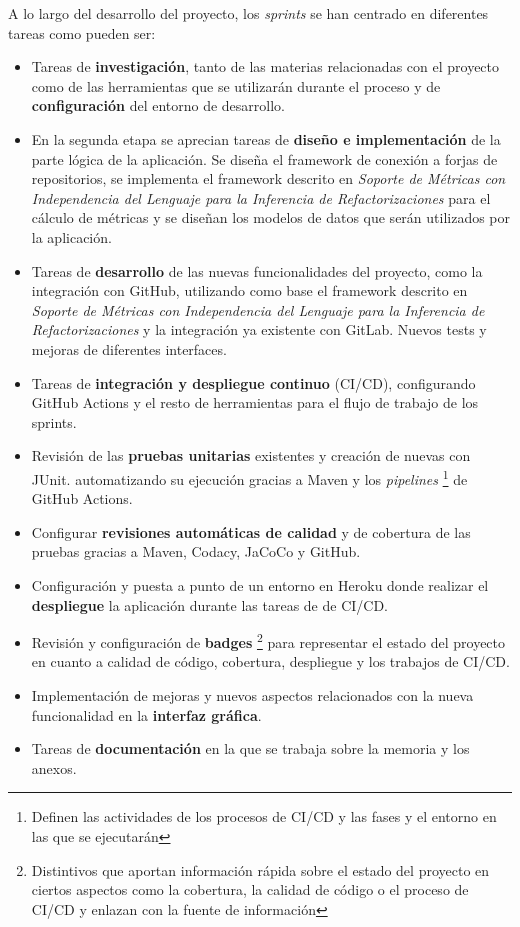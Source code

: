 A lo largo del desarrollo del proyecto, los \textit{sprints} se han centrado en diferentes tareas como pueden ser:
\begin{itemize}
	\item  Tareas de \textbf{investigación}, tanto de las materias relacionadas con el proyecto como de las herramientas que se utilizarán durante el proceso y de \textbf{configuración} del entorno de desarrollo.
	\item En la segunda etapa se aprecian tareas de \textbf{diseño e implementación} de la parte lógica de la aplicación. Se diseña el framework de conexión a forjas de repositorios, se implementa el framework descrito en \textit{Soporte de Métricas con Independencia del Lenguaje para la Inferencia de Refactorizaciones}  \cite{marticorena_sanchez_soporte_2005} para el cálculo de métricas y se diseñan los modelos de datos que serán utilizados por la aplicación.
	\item Tareas de \textbf{desarrollo} de las nuevas funcionalidades del proyecto, como la integración con GitHub, utilizando como base el framework descrito en \textit{Soporte de Métricas con Independencia del Lenguaje para la Inferencia de Refactorizaciones}  \cite{marticorena_sanchez_soporte_2005} y la integración ya existente con GitLab. Nuevos tests y mejoras de diferentes interfaces.
	\item Tareas de \textbf{integración y despliegue continuo} (CI/CD), configurando GitHub Actions y el resto de herramientas para el flujo de trabajo de los sprints.
	\item Revisión de las \textbf{pruebas unitarias} existentes y creación de nuevas con JUnit. automatizando su ejecución gracias a Maven y los \textit{pipelines} \footnote{Definen las actividades de los procesos de CI/CD y las fases y el entorno en las que se ejecutarán} de GitHub Actions.
		\item Configurar \textbf{revisiones automáticas de calidad} y de cobertura de las pruebas gracias a Maven, Codacy, JaCoCo y GitHub.
	\item Configuración y puesta a punto de un entorno en Heroku donde realizar el \textbf{despliegue} la aplicación durante las tareas de de CI/CD.
	\item Revisión y configuración de \textbf{badges} \footnote{Distintivos que aportan información rápida sobre el estado del proyecto en ciertos aspectos como la cobertura, la calidad de código o el proceso de CI/CD y enlazan con la fuente de información} para representar el estado del proyecto en cuanto a calidad de código, cobertura, despliegue y los trabajos de CI/CD.
	\item Implementación de mejoras y nuevos aspectos relacionados con la nueva funcionalidad en la \textbf{interfaz gráfica}.
	\item Tareas de \textbf{documentación} en la que se trabaja sobre la memoria y los anexos.
\end{itemize}

